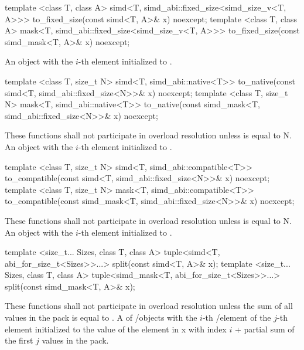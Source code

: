 \begin{itemdecl}
template <class T, class A>
simd<T, simd_abi::fixed_size<simd_size_v<T, A>>> to_fixed_size(const simd<T, A>& x) noexcept;
template <class T, class A>
mask<T, simd_abi::fixed_size<simd_size_v<T, A>>> to_fixed_size(const simd_mask<T, A>& x) noexcept;
\end{itemdecl}
\begin{itemdescr}
  \pnum\returns An object with the $i$-th element initialized to .
\end{itemdescr}

\begin{itemdecl}
template <class T, size_t N>
simd<T, simd_abi::native<T>> to_native(const simd<T, simd_abi::fixed_size<N>>& x) noexcept;
template <class T, size_t N>
mask<T, simd_abi::native<T>> to_native(const simd_mask<T, simd_abi::fixed_size<N>>& x) noexcept;
\end{itemdecl}
\begin{itemdescr}
  \pnum\remarks These functions shall not participate in overload resolution unless  is equal to \code N.
  \pnum\returns An object with the $i$-th element initialized to .
\end{itemdescr}

\begin{itemdecl}
template <class T, size_t N>
simd<T, simd_abi::compatible<T>> to_compatible(const simd<T, simd_abi::fixed_size<N>>& x) noexcept;
template <class T, size_t N>
mask<T, simd_abi::compatible<T>> to_compatible(const simd_mask<T, simd_abi::fixed_size<N>>& x) noexcept;
\end{itemdecl}
\begin{itemdescr}
  \pnum\remarks These functions shall not participate in overload resolution unless  is equal to \code N.
  \pnum\returns An object with the $i$-th element initialized to .
\end{itemdescr}

\begin{itemdecl}
template <size_t... Sizes, class T, class A>
tuple<simd<T, abi_for_size_t<Sizes>>...> split(const simd<T, A>& x);
template <size_t... Sizes, class T, class A>
tuple<simd_mask<T, abi_for_size_t<Sizes>>...> split(const simd_mask<T, A>& x);
\end{itemdecl}
\begin{itemdescr}
  \pnum\remarks These functions shall not participate in overload resolution unless the sum of all values in the  pack is equal to .
  \pnum\returns A  of \simd/\mask objects with the $i$-th \simd/\mask element of the $j$-th  element initialized to the value of the element in \code x with index $i$ + partial sum of the first $j$ values in the  pack.
\end{itemdescr}

